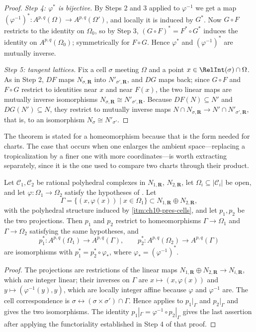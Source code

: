 \begin{proof}
\emph{Step 4: $\varphi^*$ is bijective.}
By Steps 2 and 3 applied to $\varphi^{-1}$ we get a map
$(\varphi^{-1})^*:A^{p,q}(\Omega)\to A^{p,q}(\Omega')$, and locally it is
induced by $G^*$.  Now $G\circ F$ restricts to the identity on $\Omega_0$,
so by Step 3, $(G\circ F)^*=F^*\circ G^*$ induces the identity on
$A^{p,q}(\Omega_0)$; symmetrically for $F\circ G$.  Hence $\varphi^*$ and
$(\varphi^{-1})^*$ are mutually inverse.

\emph{Step 5: tangent lattices.}
Fix a cell $\sigma$ meeting $\Omega$ and a point
$x\in\RelInt(\sigma)\cap\Omega$.  As in Step 2, $DF$ maps
$N_{\sigma,\mathbf R}$ into $N'_{\sigma',\mathbf R}$, and $DG$ maps back;
since $G\circ F$ and $F\circ G$ restrict to identities near $x$ and near
$F(x)$, the two linear maps are mutually inverse isomorphisms
$N_{\sigma,\mathbf R}\cong N'_{\sigma',\mathbf R}$.  Because $DF(N)\subseteq
N'$ and $DG(N')\subseteq N$, they restrict to mutually inverse maps
$N\cap N_{\sigma,\mathbf R}\to N'\cap N'_{\sigma',\mathbf R}$, that is, to an
isomorphism $N_\sigma\cong N'_{\sigma'}$.
\end{proof}

The theorem is stated for a homeomorphism because that is the form needed for
charts.  The case that occurs when one enlarges the ambient space---replacing
a tropicalization by a finer one with more coordinates---is worth extracting
separately, since it is the one used to compare two charts through their
product.

\begin{corollary}
\label{cor:ch10-forms-graph}
Let $\mathscr C_1,\mathscr C_2$ be rational polyhedral complexes in
$N_{1,\mathbf R}$, $N_{2,\mathbf R}$, let
$\Omega_i\subseteq|\mathscr C_i|$ be open, and let
$\varphi:\Omega_1\to\Omega_2$ satisfy the hypotheses of
.  Let
\[
 \Gamma=\{(x,\varphi(x))\mid x\in\Omega_1\}
 \subset N_{1,\mathbf R}\oplus N_{2,\mathbf R},
\]
with the polyhedral structure induced by
\cref{itm:ch10-pres-cells}, and let $p_1,p_2$ be the two projections.  Then
$p_1$ and $p_2$ restrict to homeomorphisms $\Gamma\to\Omega_1$ and
$\Gamma\to\Omega_2$ satisfying the same hypotheses, and
\[
 p_1^*:A^{p,q}(\Omega_1)\longrightarrow A^{p,q}(\Gamma),
 \qquad
 p_2^*:A^{p,q}(\Omega_2)\longrightarrow A^{p,q}(\Gamma)
\]
are isomorphisms with $p_1^*=p_2^*\circ\varphi_*$, where
$\varphi_*=(\varphi^{-1})^*$.
\end{corollary}

\begin{proof}
The projections are restrictions of the linear maps
$N_{1,\mathbf R}\oplus N_{2,\mathbf R}\to N_{i,\mathbf R}$, which are integer
linear; their inverses on $\Gamma$ are $x\mapsto(x,\varphi(x))$ and
$y\mapsto(\varphi^{-1}(y),y)$, which are locally integer affine because
$\varphi$ and $\varphi^{-1}$ are.  The cell correspondence is
$\sigma\leftrightarrow(\sigma\times\sigma')\cap\Gamma$.  Hence
 applies to $p_1|_\Gamma$ and
$p_2|_\Gamma$ and gives the two isomorphisms.  The identity
$p_1|_\Gamma=\varphi^{-1}\circ p_2|_\Gamma$ gives the last assertion after
applying the functoriality established in Step 4 of that proof.
\end{proof}

